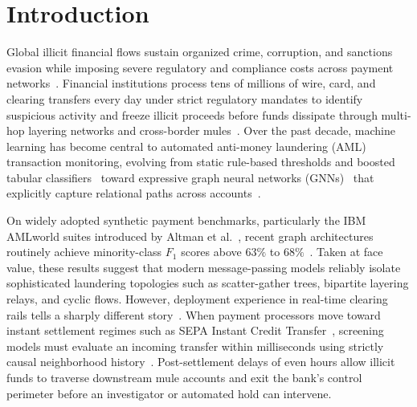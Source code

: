 \documentclass[pdflatex,sn-mathphys,Numbered]{sn-jnl}
\theoremstyle{thmstyleone}
\begin{document}

\maketitle

\section{Introduction}\label{sec:introduction}

Global illicit financial flows sustain organized crime, corruption, and sanctions evasion while imposing severe regulatory and compliance costs across payment networks~\cite{chainalysis2026crime,ferretti2025aml}. Financial institutions process tens of millions of wire, card, and clearing transfers every day under strict regulatory mandates to identify suspicious activity and freeze illicit proceeds before funds dissipate through multi-hop layering networks and cross-border mules~\cite{altman2023ibmaml,digennaro2025amatriciana,eu2024instant}. Over the past decade, machine learning has become central to automated anti-money laundering (AML) transaction monitoring, evolving from static rule-based thresholds and boosted tabular classifiers~\cite{chen2016xgboost,ke2017lightgbm} toward expressive graph neural networks (GNNs)~\cite{kipf2017gcn,hamilton2017sage,velickovic2018gat} that explicitly capture relational paths across accounts~\cite{weber2019elliptic,elmougy2023ellipticpp,egressy2024multigraph,lin2024fraudgt}.

On widely adopted synthetic payment benchmarks, particularly the IBM AMLworld suites introduced by Altman et al.~\cite{altman2023ibmaml}, recent graph architectures routinely achieve minority-class $F_1$ scores above $63\%$ to $68\%$~\cite{egressy2024multigraph,lin2024fraudgt,losavio2026saltgnn}. Taken at face value, these results suggest that modern message-passing models reliably isolate sophisticated laundering topologies such as scatter-gather trees, bipartite layering relays, and cyclic flows. However, deployment experience in real-time clearing rails tells a sharply different story~\cite{doytshman2023fraudability,verlaan2025lasgnn,mori2018early}. When payment processors move toward instant settlement regimes such as SEPA Instant Credit Transfer~\cite{eu2024instant}, screening models must evaluate an incoming transfer within milliseconds using strictly causal neighborhood history~\cite{rossi2020tgn,xu2020tgat}. Post-settlement delays of even hours allow illicit funds to traverse downstream mule accounts and exit the bank's control perimeter before an investigator or automated hold can intervene.
\end{document}
